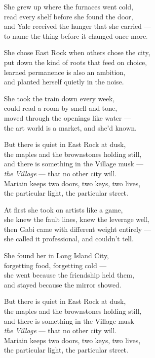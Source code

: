 \begin{lyrics}

She grew up where the furnaces went cold,\\
read every shelf before she found the door,\\
and Yale received the hunger that she carried —\\
to name the thing before it changed once more.

She chose East Rock when others chose the city,\\
put down the kind of roots that feed on choice,\\
learned permanence is also an ambition,\\
and planted herself quietly in the noise.

She took the train down every week,\\
could read a room by smell and tone,\\
moved through the openings like water —\\
the art world is a market, and she'd known.

But there is quiet in East Rock at dusk,\\
the maples and the brownstones holding still,\\
and there is something in the Village musk —\\
\emph{the Village} — that no other city will.\\
Mariain keeps two doors, two keys, two lives,\\
the particular light, the particular street.

At first she took on artists like a game,\\
she knew the fault lines, knew the leverage well,\\
then Gabi came with different weight entirely —\\
she called it professional, and couldn't tell.

She found her in Long Island City,\\
forgetting food, forgetting cold —\\
she went because the friendship held them,\\
and stayed because the mirror showed.

But there is quiet in East Rock at dusk,\\
the maples and the brownstones holding still,\\
and there is something in the Village musk —\\
\emph{the Village} — that no other city will.\\
Mariain keeps two doors, two keys, two lives,\\
the particular light, the particular street.


\end{lyrics}
